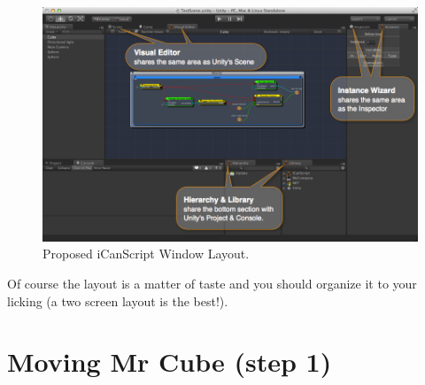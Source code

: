 \begin{figure}[htbp]
\centering
\includegraphics[keepaspectratio,width=\textwidth,height=0.75\textheight]{proposed-icanscript-window-layout.png}
\caption{Proposed iCanScript Window Layout.}
\label{proposed-icanscript-window-layout.png}
\end{figure}

Of course the layout is a matter of taste and you should organize it to your licking (a two screen layout is the best!).

\chapter{Moving Mr Cube (step 1)}
\label{movingmrcubestep1}


